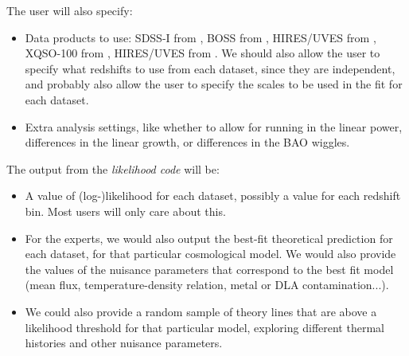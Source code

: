 The user will also specify:
\begin{itemize}
 \item Data products to use:
  SDSS-I from \cite{McDonald2006},
  BOSS from \cite{Palanque-Delabrouille2013},
  HIRES/UVES from \cite{Viel2013},
  XQSO-100 from \cite{Irsic2017},
  HIRES/UVES from \cite{Walther2018a}.
  We should also allow the user to specify what redshifts to use from each
  dataset, since they are independent, and probably also allow the user
  to specify the scales to be used in the fit for each dataset.
 \item Extra analysis settings, like whether to allow for running in the
  linear power, differences in the linear growth, or differences in the BAO
  wiggles.
\end{itemize}



The output from the \textit{likelihood code} will be:
\begin{itemize}
 \item A value of (log-)likelihood for each dataset, possibly a value for 
  each redshift bin. 
  Most users will only care about this.
 \item For the experts, we would also output the best-fit theoretical 
  prediction for each dataset, for that particular cosmological model.
  We would also provide the values of the nuisance parameters that correspond
  to the best fit model (mean flux, temperature-density relation, metal or DLA
  contamination...).
 \item We could also provide a random sample of theory lines that are above a 
  likelihood threshold for that particular model, exploring different 
  thermal histories and other nuisance parameters.
\end{itemize}


